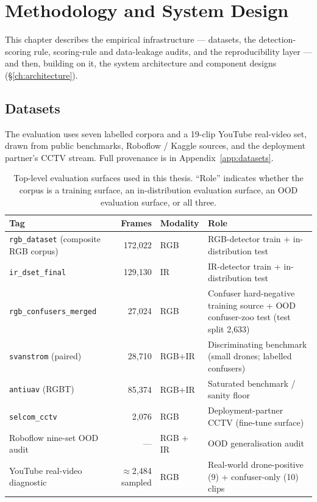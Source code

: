 \chapter{Methodology and System Design}
\label{ch:methodology}

This chapter describes the empirical infrastructure --- datasets, the detection-scoring rule, scoring-rule and data-leakage audits, and the reproducibility layer --- and then, building on it, the system architecture and component designs (\S\ref{ch:architecture}).

\section{Datasets}
\label{sec:datasets}

The evaluation uses seven labelled corpora and a 19-clip YouTube real-video set, drawn from public benchmarks, Roboflow / Kaggle sources, and the deployment partner's CCTV stream. Full provenance is in Appendix~\ref{app:datasets}.

\begin{table}[htbp]
    \centering
    \caption{Top-level evaluation surfaces used in this thesis. ``Role'' indicates whether the corpus is a training surface, an in-distribution evaluation surface, an OOD evaluation surface, or all three.}
    \label{tab:datasets}
    \begin{tabular}{lrlp{5.6cm}}
        \toprule
        Tag & Frames & Modality & Role \\
        \midrule
        \texttt{rgb\_dataset} (composite RGB corpus) & 172,022 & RGB & RGB-detector train + in-distribution test \\
        \texttt{ir\_dset\_final} & 129,130 & IR & IR-detector train + in-distribution test \\
        \texttt{rgb\_confusers\_merged} & 27,024 & RGB & Confuser hard-negative training source + OOD confuser-zoo test (test split 2{,}633) \\
        \texttt{svanstrom} (paired) & 28,710 & RGB+IR & Discriminating benchmark (small drones; labelled confusers) \\
        \texttt{antiuav} (RGBT) & 85,374 & RGB+IR & Saturated benchmark / sanity floor \\
        \texttt{selcom\_cctv} & 2,076 & RGB & Deployment-partner CCTV (fine-tune surface) \\
        Roboflow nine-set OOD audit & --- & RGB + IR & OOD generalisation audit \\
        YouTube real-video diagnostic & $\approx$2{,}484 sampled & RGB & Real-world drone-positive (9) + confuser-only (10) clips \\
        \bottomrule
    \end{tabular}
\end{table}

